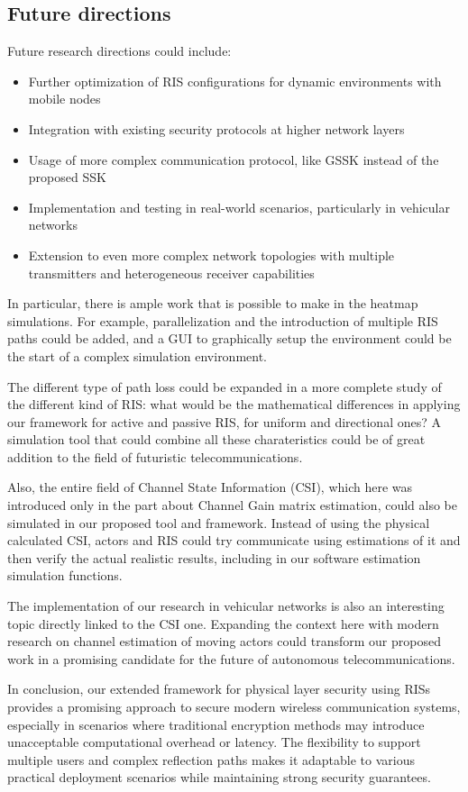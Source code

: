 \subsection{Future directions}

Future research directions could include:
\begin{itemize}
  \item Further optimization of RIS configurations for dynamic environments with mobile nodes
  \item Integration with existing security protocols at higher network layers
  \item Usage of more complex communication protocol, like GSSK \cite{4699782} instead of the proposed SSK \cite{5165332}
  \item Implementation and testing in real-world scenarios, particularly in vehicular networks
  \item Extension to even more complex network topologies with multiple transmitters and heterogeneous receiver capabilities
\end{itemize}

In particular, there is ample work that is possible to make in the heatmap simulations. For example, parallelization and the introduction of multiple RIS paths could be added, and a GUI to graphically setup the environment could be the start of a complex simulation environment.

The different type of path loss could be expanded in a more complete study of the different kind of RIS: what would be the mathematical differences in applying our framework for active and passive RIS, for uniform and directional ones? A simulation tool that could combine all these charateristics could be of great addition to the field of futuristic telecommunications.

Also, the entire field of Channel State Information (CSI), which here was introduced only in the part about Channel Gain matrix estimation, could also be simulated in our proposed tool and framework. Instead of using the physical calculated CSI, actors and RIS could try communicate using estimations of it and then verify the actual realistic results, including in our software estimation simulation functions.

The implementation of our research in vehicular networks is also an interesting topic directly linked to the CSI one. Expanding the context here with modern research on channel estimation of moving actors could transform our proposed work in a promising candidate for the future of autonomous telecommunications.

In conclusion, our extended framework for physical layer security using RISs provides a promising approach to secure modern wireless communication systems, especially in scenarios where traditional encryption methods may introduce unacceptable computational overhead or latency. The flexibility to support multiple users and complex reflection paths makes it adaptable to various practical deployment scenarios while maintaining strong security guarantees.